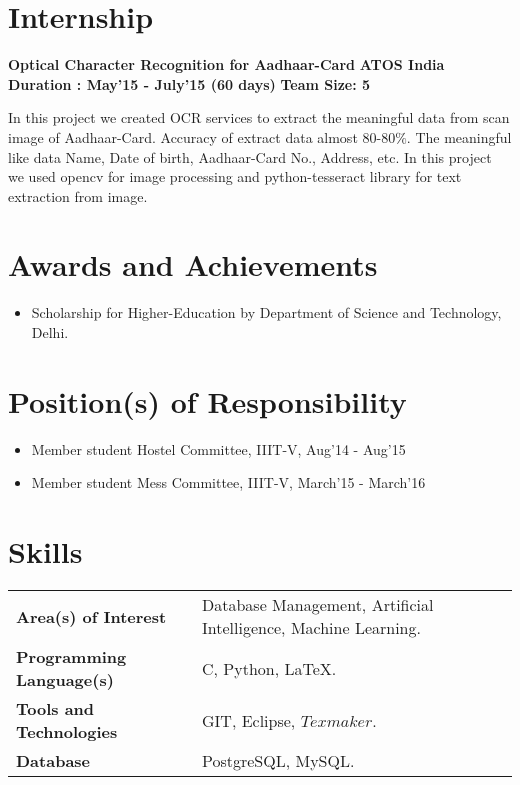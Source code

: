 \documentclass{article}
\begin{document}
\section{Internship}
\textbf{\large{Optical Character Recognition for Aadhaar-Card}} \hspace*{6cm} \textbf{ATOS India}
\textbf{Duration : May'15 - July'15 (60 days)} \hspace*{5.7cm} \textbf{Team Size: 5}

\vspace*{.051mm}
\hspace*{2.6mm} In this project we created OCR services to extract the meaningful data from scan image of Aadhaar-Card. Accuracy of extract data almost 80-80$\%.$ The meaningful like data Name, Date of birth, Aadhaar-Card No., Address, etc. In this project we used opencv for image processing and python-tesseract library for text extraction from image.\\

\vspace*{.4cm}
\section{Awards and Achievements}
\begin{itemize}
	\item Scholarship for Higher-Education by Department of Science and Technology, Delhi.
\end{itemize}

\section{Position(s) of Responsibility}
\begin{itemize}
	\item Member student Hostel Committee, IIIT-V, Aug'14 - Aug'15
	\item Member student Mess Committee, IIIT-V, March'15 - March'16
\end{itemize}

\section{Skills}
\begin{tabular}{ll}
\textbf{Area(s) of Interest} &Database Management, Artificial Intelligence, Machine Learning.\\
\textbf{Programming Language(s)}&C, Python, \LaTeX.\\
\textbf{Tools and Technologies} & GIT, Eclipse, $Texmaker$. \\
\textbf{Database} & PostgreSQL, MySQL.\\
\end{tabular}
\end{document}
